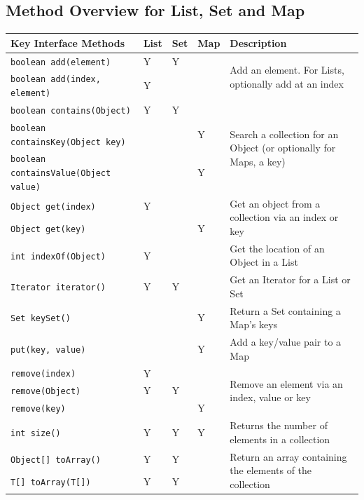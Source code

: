 \subsection{Method Overview for List, Set and Map}
\begin{center}
\begin{tabular}{llllp{}}
    \textbf{Key Interface Methods} & \textbf{List} & \textbf{Set} & 
    \textbf{Map} & \textbf{Description} \\
    \hline
    \verb#boolean add(element)# & Y & Y & & \multirow{2}{0.3\textwidth}{Add an 
    element. For Lists, optionally add at an index} \\
    \verb#boolean add(index, element)# & Y & & & \\
    \hline
    \verb#boolean contains(Object)# & Y & Y & & 
    \multirow{3}{0.3\textwidth}{Search a collection for an Object (or 
    optionally for Maps, a key)} \\
    \verb#boolean containsKey(Object key)# & & & Y & \\
    \verb#boolean containsValue(Object value)# & & & Y & \\
    \hline
    \verb#Object get(index)# & Y & & & \multirow{2}{0.3\textwidth}{Get an 
    object from a collection via an index or key} \\
    \verb#Object get(key)# & & & Y & \\
    \hline
    \verb#int indexOf(Object)# & Y & & & Get the location of an Object in a 
    List \\
    \hline
    \verb#Iterator iterator()# & Y & Y & & Get an Iterator for a List or Set \\
    \hline
    \verb#Set keySet()# & & & Y & Return a Set containing a Map's keys \\
    \hline
    \verb#put(key, value)# & & & Y & Add a key/value pair to a Map \\
    \hline
    \verb#remove(index)# & Y & & & \multirow{3}{0.3\textwidth}{Remove an 
    element via an index, value or key} \\
    \verb#remove(Object)# & Y & Y & & \\
    \verb#remove(key)# & & & Y & \\
    \hline
    \verb#int size()# & Y & Y & Y & Returns the number of elements in a 
    collection \\
    \hline
    \verb#Object[] toArray()# & Y & Y & & \multirow{2}{0.3\textwidth}{Return an 
    array containing the elements of the collection} \\
    \verb#T[] toArray(T[])# & Y & Y & & \\
    \hline
\end{tabular}
\end{center}

